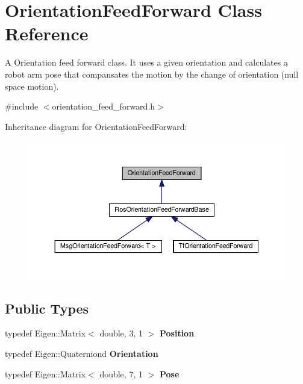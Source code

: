 \hypertarget{classOrientationFeedForward}{}\section{Orientation\+Feed\+Forward Class Reference}
\label{classOrientationFeedForward}


A Orientation feed forward class. It uses a given orientation and calculates a robot arm pose that compansates the motion by the change of orientation (null space motion).  




{\ttfamily \#include $<$orientation\+\_\+feed\+\_\+forward.\+h$>$}



Inheritance diagram for Orientation\+Feed\+Forward\+:\nopagebreak
\begin{figure}[H]
\begin{center}
\leavevmode
\includegraphics[width=350pt]{dd/d46/classOrientationFeedForward__inherit__graph}
\end{center}
\end{figure}
\subsection*{Public Types}
\begin{DoxyCompactItemize}
\item 
\mbox{\label{classOrientationFeedForward_a45f6220dd29a9df06f62eeed86189101}} 
typedef Eigen\+::\+Matrix$<$ double, 3, 1 $>$ {\bfseries Position}
\item 
\mbox{\label{classOrientationFeedForward_a329654d4c6d79679903a76c624330f99}} 
typedef Eigen\+::\+Quaterniond {\bfseries Orientation}
\item 
\mbox{\label{classOrientationFeedForward_a68247ebc7099747e21cbd56d4dbc405a}} 
typedef Eigen\+::\+Matrix$<$ double, 7, 1 $>$ {\bfseries Pose}
\end{DoxyCompactItemize}
